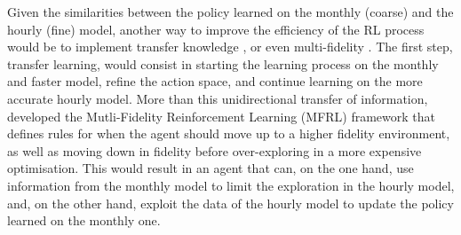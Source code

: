 Given the similarities between the policy learned on the monthly (coarse) and the hourly (fine) model, another way to improve the efficiency of the \gls{RL} process would be to implement transfer knowledge \cite{mann2013directed}, or even multi-fidelity \cite{cutler2014reinforcement}.  The first step, transfer learning, would consist in starting the learning process on the monthly and faster model, refine the action space, and continue learning on the more accurate hourly model.  More than this unidirectional transfer of information, \citet{cutler2014reinforcement} developed the Mutli-Fidelity Reinforcement Learning (MFRL) framework that defines rules for when the agent should move up to a higher fidelity environment, as well as moving down in fidelity before over-exploring in a more expensive optimisation.  This would result in an agent that can, on the one hand, use information from the monthly model to limit the exploration in the hourly model, and, on the other hand, exploit the data of the hourly model to update the policy learned on the monthly one.